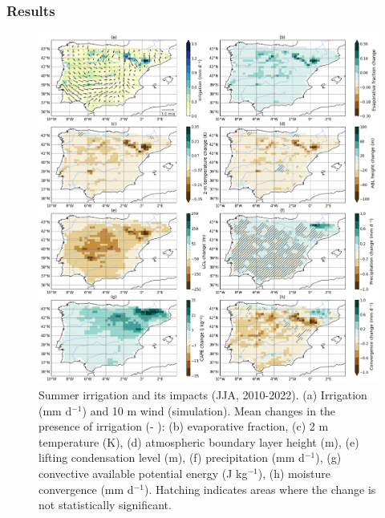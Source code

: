 \subsubsection{Results}
\begin{figure}[htbp]
    \centering
    \includegraphics[width=15cm]{images/chap4/article/f07.png}
    \caption{Summer irrigation and its impacts (JJA, 2010-2022). (a) Irrigation (mm d$^{-1}$) and 10 m wind (\irr simulation). Mean changes in the presence of irrigation (\irr - \noirr): (b) evaporative fraction, (c) 2 m temperature (K), (d) atmospheric boundary layer height (m), (e) lifting condensation level (m), (f) precipitation (mm d$^{-1}$), (g) convective available potential energy (J kg$^{-1}$), (h) moisture convergence (mm d$^{-1}$). Hatching indicates areas where the change is not statistically significant.}
    \label{fig:diff_sig_6vars}
\end{figure}

